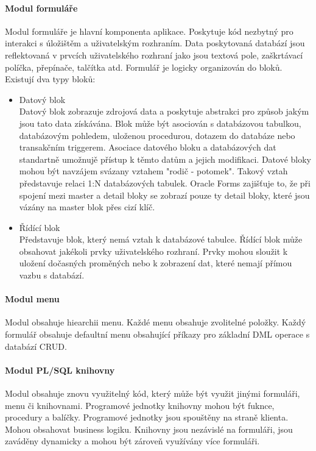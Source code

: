\documentclass{bakalarka}
\begin{document}
\paragraph{Modul formuláře} 
Modul formuláře je hlavní komponenta aplikace. Poskytuje kód nezbytný pro interakci s úložištěm a uživatelským rozhraním. 
Data poskytovaná databází jsou reflektovaná v prvcích uživatelského rozhraní jako jsou textová pole, zaškrtávací políčka, přepínače, talčítka atd. Formulář je logicky organizován do bloků. Existují dva typy bloků: 
\begin{itemize}
\item Datový blok\\ Datový blok zobrazuje zdrojová data a poskytuje abstrakci pro způsob jakým jsou tato data získávána. Blok může být asociován s databázovou tabulkou, databázovým pohledem, uloženou procedurou, dotazem do databáze nebo transakčním triggerem. Asociace datového bloku a databázových dat standartně umožnujě přístup k těmto datům a jejich modifikaci.\indent
Datové bloky mohou být navzájem svázany vztahem "rodič - potomek". Takový vztah představuje relaci 1:N databázových tabulek. Oracle Forms zajišťuje to, že při spojení mezi master a detail bloky se zobrazí pouze ty detail bloky, které jsou vázány na master blok přes cizí klíč. 

\item Řídící blok \\
Představuje blok, který nemá vztah k databázové tabulce. Řídící blok může obsahovat jakékoli prvky uživatelského rozhraní. Prvky mohou sloužit k uložení dočasných proměných nebo k zobrazení dat, které nemají přímou vazbu s databází. 
\end{itemize}

\paragraph{Modul menu} 
Modul obsahuje hiearchii menu. Každé menu obsahuje zvolitelné položky. Každý formulář obsahuje defaultní menu obsahující příkazy pro základní DML operace s databází CRUD.

\paragraph{Modul PL/SQL knihovny}
Modul obsahuje znovu využitelný kód, který může být využit jinými formuláři, menu či knihovnami. Programové jednotky knihovny mohou být fuknce, procedury a balíčky. Programové jednotky jsou spouštěny na straně klienta. Mohou obsahovat business logiku. Knihovny jsou nezávislé na formuláři, jsou zaváděny dynamicky a mohou být zároveň využívány více formuláři.
\end{document}
